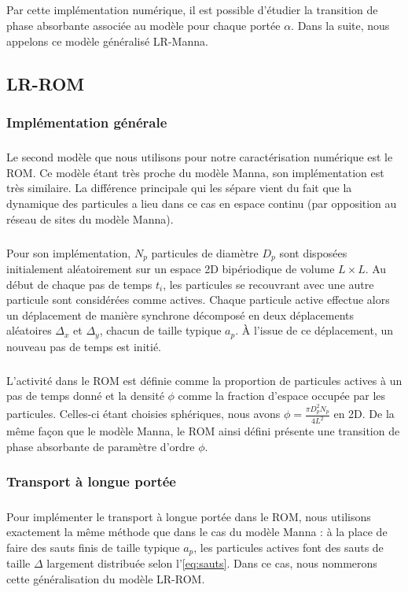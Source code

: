 \subparagraph{}Par cette implémentation numérique, il est possible d'étudier la transition de phase absorbante associée au modèle pour chaque portée $\alpha$. Dans la suite, nous appelons ce modèle généralisé LR-Manna.

\subsection{LR-ROM}

\label{sec:implementation_ROM}

\subsubsection{Implémentation générale}

\subparagraph{}Le second modèle que nous utilisons pour notre caractérisation numérique est le ROM. Ce modèle étant très proche du modèle Manna, son implémentation est très similaire. La différence principale qui les sépare vient du fait que la dynamique des particules a lieu dans ce cas en espace continu (par opposition au réseau de sites du modèle Manna). 

\subparagraph{}Pour son implémentation, $N_p$ particules de diamètre $D_p$ sont disposées initialement aléatoirement sur un espace 2D bipériodique de volume $L\times L$. Au début de chaque pas de temps $t_i$, les particules se recouvrant avec une autre particule sont considérées comme actives. Chaque particule active effectue alors un déplacement de manière synchrone décomposé en deux déplacements aléatoires $\Delta_x$ et $\Delta_y$, chacun de taille typique $a_p$. \`A l'issue de ce déplacement, un nouveau pas de temps est initié.

\subparagraph{}L'activité dans le ROM est définie comme la proportion de particules actives à un pas de temps donné et la densité $\phi$ comme la fraction d'espace occupée par les particules. Celles-ci étant choisies sphériques, nous avons $\phi = \frac{\pi D_p^2 N_p}{4 L^2}$ en 2D. De la même façon que le modèle Manna, le ROM ainsi défini présente une transition de phase absorbante de paramètre d'ordre $\phi$.

\subsubsection{Transport à longue portée}

\subparagraph{}Pour implémenter le transport à longue portée dans le ROM, nous utilisons exactement la même méthode que dans le cas du modèle Manna : à la place de faire des sauts finis de taille typique $a_p$, les particules actives font des sauts de taille $\Delta$ largement distribuée selon l'\autoref{eq:sauts}. Dans ce cas, nous nommerons cette généralisation du modèle LR-ROM.

